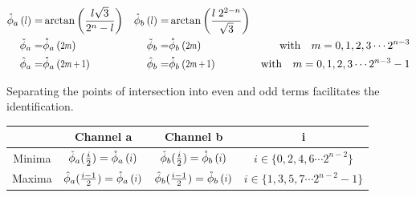 \begin{align*}\label{eq:ExtremaFunctions}
 \extremaTheta{a} {l}= & \arctan\left(\frac{l \sqrt{3} }{2^n - l}\right) &
 \extremaTheta{b} {l}= & \arctan\left(\frac{l \; 2^{2-n}}{\sqrt{3}}       \right) \\ 
 \minimaTheta{a} = & \extremaTheta{a} {2m} &
 \minimaTheta{b} = & \extremaTheta{b} {2m} 
 & \text{with}\quad   m =  0,1,2,3 \cdots2^{n-3} \\
  \maximaTheta{a} = & \extremaTheta{a} {2m+1} &
  \maximaTheta{b} = & \extremaTheta{b} {2m+1} 
 &\text{with}\quad   m =  0,1,2,3 \cdots2^{n-3}-1 
\end{align*}


Separating the points of intersection into even and odd terms facilitates the identification. 

\begin{tabular}{|c|c|c|c|}
\hline
  & Channel a & Channel b &  i \\ 
\hline Minima  &  $ \minimaTheta{a}(\frac{i}{2})=\extremaTheta{a}{i} $ & $ \minimaTheta{b}(\frac{i}{2})=\extremaTheta{b}{i} $ & $ i \in \{0,2,4,6\cdots2^{n-2} \} $\\ 
\hline Maxima  &  $     \maximaTheta{a}(\frac{i-1}{2})=\extremaTheta{a}{i} $ & $     \maximaTheta{b}(\frac{i-1}{2})=\extremaTheta{b}{i} $ & $ i \in \{1,3,5,7\cdots2^{n-2}-1\}  $ \\ 
\hline 
\end{tabular} 



